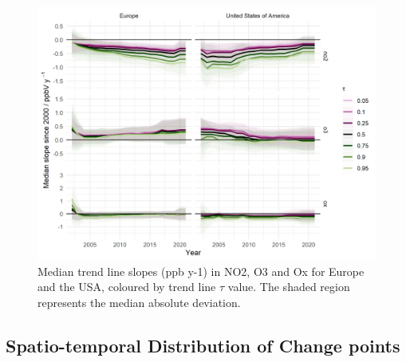 \documentclass[journal abbreviation, manuscript]{copernicus}
\begin{document}
\begin{figure}[t]
\includegraphics[width=12cm]{plots/fixed_median_slopes_per_tau_continent_name.png}
\caption{Median trend line slopes (ppb y-1) in NO2, O3 and Ox for Europe and the USA, coloured by trend line $\tau$ value. The shaded region represents the median absolute deviation.}
\label{median_slopes_per_tau_cont_name_trends}
\end{figure}

\clearpage

\subsection{Spatio-temporal Distribution of Change points} \label{sect:case_studies}

\end{document}
